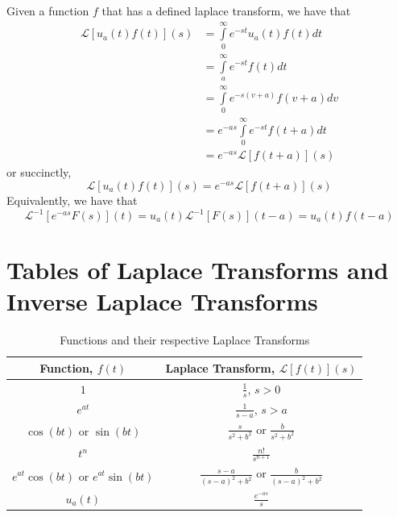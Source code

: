 \documentclass[12pt, a4paper, oneside, openright, titlepage]{book}
\begin{document}
\begin{props}
        Given a function $f$ that has a defined laplace transform, we have that \begin{align*}
                \mathcal{L}[u_a(t)f(t)](s) &= \int\limits_{0}^{\infty}e^{-st}u_a(t)f(t)dt \\
                &= \int\limits_{a}^{\infty}e^{-st}f(t)dt\tag{take $v = t - a$, $dv=dt$} \\
                &= \int\limits_{0}^{\infty}e^{-s(v+a)}f(v+a)dv\tag{shift $v \rightarrow t$} \\
                &= e^{-as}\int\limits_{0}^{\infty}e^{-st}f(t+a)dt \\
                &= e^{-as}\mathcal{L}[f(t+a)](s)
        \end{align*}
        or succinctly, \begin{equation}
                \mathcal{L}[u_a(t)f(t)](s) = e^{-as}\mathcal{L}[f(t+a)](s)
        \end{equation}
        Equivalently, we have that \begin{equation}
                \mathcal{L}^{-1}[e^{-as}F(s)](t) = u_a(t)\mathcal{L}^{-1}[F(s)](t-a) = u_a(t)f(t-a)
        \end{equation}
\end{props}






\section{Tables of Laplace Transforms and Inverse Laplace Transforms}


\bgroup
\def\arraystretch{1.5}
\begin{table}[H]
        \centering
        \caption{Functions and their respective Laplace Transforms}
        \begin{tabular}{c|c}
                Function, $f(t)$ & Laplace Transform, $\mathcal{L}[f(t)](s)$ \\ \hline
                $1$ & $\frac{1}{s}$, $s > 0$ \\
                $e^{at}$ & $\frac{1}{s-a}$, $s > a$ \\
                $\cos(bt)$ or $\sin(bt)$ & $\frac{s}{s^2+b^2}$ or $\frac{b}{s^2+b^2}$ \\
                $t^n$ & $\frac{n!}{s^{n+1}}$ \\
                $e^{at}\cos(bt)$ or $e^{at}\sin(bt)$ & $\frac{s-a}{(s-a)^2+b^2}$ or $\frac{b}{(s-a)^2+b^2}$ \\
                $u_a(t)$ & $\frac{e^{-as}}{s}$ \\
        \end{tabular}
\end{table}
\egroup
\end{document}
